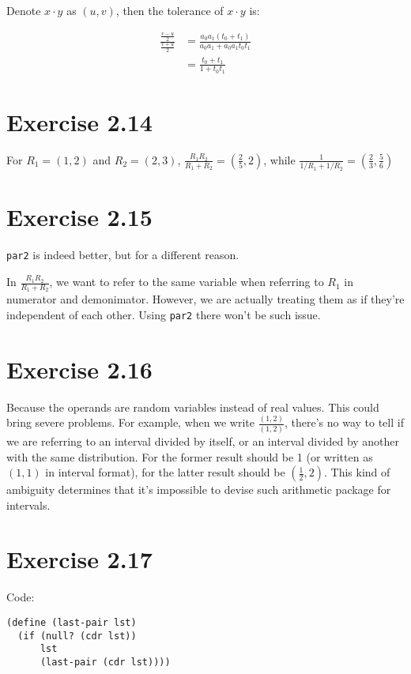 \documentclass[../main.tex]{subfiles}
\begin{document}
Denote $x \cdot y$ as $(u, v)$, then the tolerance of $x \cdot y$ is:

\begin{align*}
\frac{\frac{v-u}{2}}{\frac{v+u}{2}} &= \frac{a_0 a_1 (t_0 + t_1)}{a_0 a_1 + a_0 a_1 t_0 t_1} \\
&= \frac{t_0 + t_1}{1 + t_0 t_1}
\end{align*}

\section{Exercise 2.14}

For $R_1 = (1, 2)$ and $R_2 = (2, 3)$, $\frac{R_1 R_2}{R_1 + R_2} = (\frac{2}{5}, 2)$, while
$\frac{1}{1/R_1 + 1/R_2} = (\frac{2}{3}, \frac{5}{6})$

\section{Exercise 2.15}

\lstinline{par2} is indeed better, but for a different reason.

In $\frac{R_1 R_2}{R_1 + R_2}$, we want to refer to the same variable
 when referring to $R_1$ in numerator and demonimator. However, we are
 actually treating them as if they're independent of each other. Using
 \lstinline{par2} there won't be such issue.

\section{Exercise 2.16}

Because the operands are random variables instead of real values. This
 could bring severe problems. For example, when we write $\frac{(1, 2)}{(1, 2)}$,
 there's no way to tell if we are referring to an interval divided by itself,
 or an interval divided by another with the same distribution. For the former
 result should be 1 (or written as $(1, 1)$ in interval format), for the latter
 result should be $(\frac{1}{2}, 2)$. This kind of ambiguity determines that
 it's impossible to devise such arithmetic package for intervals.

\section{Exercise 2.17}

Code:

\begin{lstlisting}
(define (last-pair lst)
  (if (null? (cdr lst))
      lst
      (last-pair (cdr lst))))
\end{lstlisting}
\end{document}
